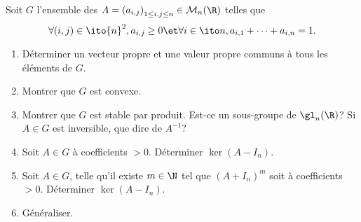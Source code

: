 \begin{enonce}
\begin{exercise}[ID={RMS125 E782, 2014 Centrale MP},subtitle={},tags={}, difficulty={0}]
Soit $G$ l'ensemble des $A=\left( a_{i,j} \right)_{1\leq i,j\leq n}\in\mathcal{M}_n(\R)$ telles que
\begin{equation*}
  \forall(i,j)\in\ito{n}^2, a_{i,j}\geq 0 \et \forall i\in\ito n, a_{i,1}+\dots+a_{i,n}=1.
\end{equation*}
\begin{enumerate}
  \item Déterminer un vecteur propre et une valeur propre communs à tous les éléments de $G$.
  \item Montrer que $G$ est convexe.
  \item Montrer que $G$ est stable par produit.
    Est-ce un sous-groupe de $\gl_n(\R)$?
    Si $A\in G$ est inversible, que dire de $A^{-1}$?

  \item Soit $A\in G$ à coefficients $>0$.
    Déterminer $\ker(A-I_n)$.
  \item Soit $A\in G$, telle qu'il existe $m\in\N$ tel que $(A+I_n)^m$ soit à coefficients $>0$.
    Déterminer $\ker(A-I_n)$.

  \item Généraliser.  
\end{enumerate}
\end{exercise}
\begin{solution}
\end{solution}
\end{enonce}
